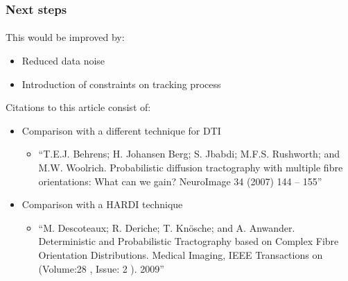 \documentclass[10pt]{beamer}
\begin{document}
  \begin{frame}
    \frametitle{Next steps}
    \framesubtitle{}

    This would be improved by:
    \begin{itemize}
      \item Reduced data noise
      \item Introduction of constraints on tracking process
    \end{itemize}

    Citations to this article consist of:
    \begin{itemize}
      \item Comparison with a different technique for DTI
        \begin{itemize}
          \item ``T.E.J. Behrens; H. Johansen Berg; S. Jbabdi; M.F.S. Rushworth; and M.W. Woolrich. Probabilistic diffusion tractography with multiple fibre orientations: What can we gain? NeuroImage 34 (2007) 144 – 155''
        \end{itemize}
      \item Comparison with a HARDI technique
        \begin{itemize}
          \item ``M. Descoteaux; R. Deriche; T. Knösche; and A. Anwander. Deterministic and Probabilistic Tractography based on Complex Fibre Orientation Distributions. Medical Imaging, IEEE Transactions on  (Volume:28 ,  Issue: 2 ). 2009''
        \end{itemize}
    \end{itemize}
  \end{frame}
\end{document}
